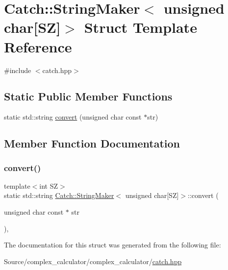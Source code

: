\hypertarget{struct_catch_1_1_string_maker_3_01unsigned_01char[_s_z]_4}{}\section{Catch\+:\+:String\+Maker$<$ unsigned char\mbox{[}SZ\mbox{]}$>$ Struct Template Reference}
\label{struct_catch_1_1_string_maker_3_01unsigned_01char[_s_z]_4}


{\ttfamily \#include $<$catch.\+hpp$>$}

\subsection*{Static Public Member Functions}
\begin{DoxyCompactItemize}
\item 
static std\+::string \mbox{\hyperlink{struct_catch_1_1_string_maker_3_01unsigned_01char[_s_z]_4_a590d64c72b0cc75c113f1eea95d52b66}{convert}} (unsigned char const $\ast$str)
\end{DoxyCompactItemize}


\subsection{Member Function Documentation}
\mbox{\label{struct_catch_1_1_string_maker_3_01unsigned_01char[_s_z]_4_a590d64c72b0cc75c113f1eea95d52b66}} 
\subsubsection{\texorpdfstring{convert()}{convert()}}
{\footnotesize\ttfamily template$<$int SZ$>$ \\
static std\+::string \mbox{\hyperlink{struct_catch_1_1_string_maker}{Catch\+::\+String\+Maker}}$<$ unsigned char\mbox{[}SZ\mbox{]}$>$\+::convert (\begin{DoxyParamCaption}\item[{unsigned char const $\ast$}]{str }\end{DoxyParamCaption})\hspace{0.3cm}{\ttfamily [inline]}, {\ttfamily [static]}}



The documentation for this struct was generated from the following file\+:\begin{DoxyCompactItemize}
\item 
Source/complex\+\_\+calculator/complex\+\_\+calculator/\mbox{\hyperlink{catch_8hpp}{catch.\+hpp}}\end{DoxyCompactItemize}
